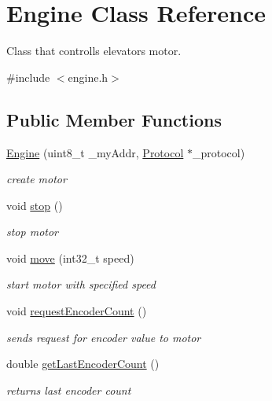 \hypertarget{classEngine}{}\section{Engine Class Reference}
\label{classEngine}


Class that controlls elevator\textquotesingle{}s motor.  




{\ttfamily \#include $<$engine.\+h$>$}

\subsection*{Public Member Functions}
\begin{DoxyCompactItemize}
\item 
\hyperlink{classEngine_a38f43c750e038ee25889e3643ef1f599}{Engine} (uint8\+\_\+t \+\_\+my\+Addr, \hyperlink{classProtocol}{Protocol} $\ast$\+\_\+protocol)
\begin{DoxyCompactList}\small\item\em create motor \end{DoxyCompactList}\item 
\mbox{\label{classEngine_ac88ada17b33bc5ddaf6bb73e0cdc67f3}} 
void \hyperlink{classEngine_ac88ada17b33bc5ddaf6bb73e0cdc67f3}{stop} ()
\begin{DoxyCompactList}\small\item\em stop motor \end{DoxyCompactList}\item 
void \hyperlink{classEngine_a580259b41fb482c17c854a07a38ccbd4}{move} (int32\+\_\+t speed)
\begin{DoxyCompactList}\small\item\em start motor with specified speed \end{DoxyCompactList}\item 
\mbox{\label{classEngine_acf0356ac59a0cd3434b78fd10e78e220}} 
void \hyperlink{classEngine_acf0356ac59a0cd3434b78fd10e78e220}{request\+Encoder\+Count} ()
\begin{DoxyCompactList}\small\item\em sends request for encoder value to motor \end{DoxyCompactList}\item 
double \hyperlink{classEngine_a1bbe0026794f4fb38599d64aeaca399f}{get\+Last\+Encoder\+Count} ()
\begin{DoxyCompactList}\small\item\em returns last encoder count \end{DoxyCompactList}\item 

\end{DoxyCompactItemize}
